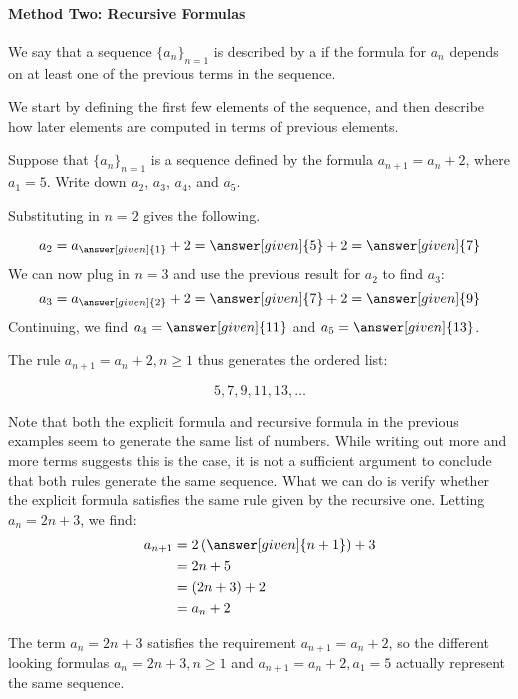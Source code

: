 \documentclass{ximera}
\begin{document}

\paragraph{Method Two: Recursive Formulas}

\begin{definition}
We say that a sequence $\{a_n\}_{n=1}$ is described by a  if the formula for $a_n$ depends on at least one of the previous terms in the sequence.
\end{definition}

We start by defining the first few elements of the sequence, and then describe how later elements are computed in terms of previous elements.

\begin{example}
 Suppose that $\{a_n\}_{n=1}$ is a sequence defined by the formula $a_{n+1} = a_n+2$, where $a_1 = 5$.  Write down $a_2$, $a_3$, $a_4$, and $a_5$.
 
 \begin{explanation}
 Substituting in $n=2$ gives the following.
 
 \[
 a_2 = a_{\answer[given]{1}}+2 = \answer[given]{5}+2 = \answer[given]{7}
 \]
 We can now plug in $n=3$ and use the previous result for $a_2$ to find $a_3$:
  \[
 a_3 = a_{\answer[given]{2}}+2 = \answer[given]{7}+2 = \answer[given]{9}
 \]
 Continuing, we find $a_4 = \answer[given]{11}$ and $a_5 = \answer[given]{13}$.
 
The rule $a_{n+1} = a_n+2, n \geq 1$ thus generates the ordered list:

\[
5,7,9,11,13, \dots
\]   

 \end{explanation}
\end{example}

\begin{remark} Note that both the explicit formula and recursive formula in the previous examples seem to generate the same list of numbers.  While writing out more and more terms suggests this is the case, it is not a sufficient argument to conclude that both rules generate the same sequence.  What we can do is verify whether the explicit formula satisfies the same rule given by the recursive one.  Letting $a_n = 2n+3$, we find:
\begin{align*}
a_{n+1} &= 2\left(\answer[given]{n+1}\right)+3 \\
&= 2n+5 \\
&= \left(2n+3\right) +2 \\
&= a_n+2
\end{align*}  

The term $a_n = 2n+3$ satisfies the requirement $a_{n+1}=a_n+2$, so the different looking formulas $a_n = 2n+3, n \geq 1$ and $a_{n+1}=a_n+2, a_1=5$ actually represent the same sequence.
\end{remark}
\end{document}
